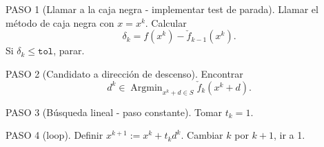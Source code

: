 \documentclass[a4paper,12pt]{report}
\begin{document}
PASO 1 (Llamar a la caja negra - implementar test de parada). Llamar el m\'etodo de caja negra con $x=x^k$. Calcular
\begin{equation}\label{delta}
\delta_k=f(x^k)-\check{f}_{k-1}(x^k).
\end{equation}
Si $\delta_k\leq\mathtt{tol}$, parar.

PASO 2 (Candidato a direcci\'on de descenso). Encontrar
\begin{equation}\label{direccion}
d^k\in\mathop{\mathrm{Argmin}}_{x^k+d\in S}\check{f}_k(x^k+d).
\end{equation}

PASO 3 (B\'usqueda lineal - paso constante). Tomar $t_k=1.$

PASO 4 (loop). Definir $x^{k+1}:=x^k+t_k d^k$. Cambiar $k$ por $k+1$, ir a 1. 
\end{document}
